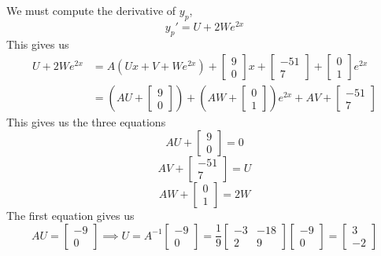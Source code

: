 \documentclass[openany]{report}
\begin{document}
We must compute the derivative of $y_p$, 
\[y_p' = U + 2We^{2x}\]
This gives us 
\begin{align*}
   U + 2We^{2x} &= A(Ux + V + We^{2x}) + \begin{bmatrix}
    9\\0
\end{bmatrix}x + \begin{bmatrix}
    -51\\7
\end{bmatrix} + \begin{bmatrix}
    0\\1
\end{bmatrix}e^{2x}\\
&= \left(AU + \begin{bmatrix}
    9\\0
\end{bmatrix}\right) + \left(AW + \begin{bmatrix}
    0\\1
\end{bmatrix}\right)e^{2x} +AV + \begin{bmatrix}
    -51\\7
\end{bmatrix}
\end{align*}
This gives us the three equations 
\[AU + \begin{bmatrix}
    9\\0
\end{bmatrix} = 0\]
\[AV + \begin{bmatrix}
    -51\\7
\end{bmatrix} = U\]
\[AW + \begin{bmatrix}
    0\\1
\end{bmatrix} = 2W\]
The first equation gives us 
\[AU = \begin{bmatrix}
    -9\\0
\end{bmatrix} \implies U = A^{-1}\begin{bmatrix}
    -9\\0
\end{bmatrix} = \frac{1}{9}\begin{bmatrix}
    -3 & -18\\
    2 & 9
\end{bmatrix}\begin{bmatrix}
    -9\\0
\end{bmatrix} = \begin{bmatrix}
    3\\-2
\end{bmatrix}\]
\end{document}
